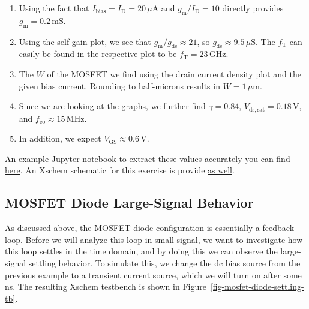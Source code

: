 \documentclass[
  a4paper,
  DIV=11,
  numbers=noendperiod]{scrartcl}
\providecommand{\tightlist}{%
  \setlength{\itemsep}{0pt}\setlength{\parskip}{0pt}}\usepackage{longtable,booktabs,array}
\begin{document}
\begin{tcolorbox}[enhanced jigsaw, titlerule=0mm, left=2mm, coltitle=black, toprule=.15mm, breakable, opacitybacktitle=0.6, colframe=quarto-callout-tip-color-frame, bottomtitle=1mm, toptitle=1mm, opacityback=0, colbacktitle=quarto-callout-tip-color!10!white, title=\textcolor{quarto-callout-tip-color}{\faLightbulb}\hspace{0.5em}{Solution: MOSFET Diode Sizing}, arc=.35mm, rightrule=.15mm, colback=white, bottomrule=.15mm, leftrule=.75mm]

\begin{enumerate}
\def\labelenumi{\arabic{enumi}.}
\tightlist
\item
  Using the fact that
  \(I_\mathrm{bias} = I_\mathrm{D} = 20\,\mu\text{A}\) and
  \(g_\mathrm{m}/I_\mathrm{D}= 10\) directly provides
  \(g_\mathrm{m}= 0.2\,\text{mS}\).
\item
  Using the self-gain plot, we see that
  \(g_\mathrm{m}/g_\mathrm{ds}\approx 21\), so
  \(g_\mathrm{ds}\approx 9.5\,\mu\text{S}\). The \(f_\mathrm{T}\) can
  easily be found in the respective plot to be
  \(f_\mathrm{T} = 23\,\text{GHz}\).
\item
  The \(W\) of the MOSFET we find using the drain current density plot
  and the given bias current. Rounding to half-microns results in
  \(W = 1\,\mu\text{m}\).
\item
  Since we are looking at the graphs, we further find \(\gamma = 0.84\),
  \(V_\mathrm{ds,sat} = 0.18\,\text{V}\), and
  \(f_\mathrm{co} \approx 15\,\text{MHz}\).
\item
  In addition, we expect \(V_\mathrm{GS}\approx 0.6\,\text{V}\).
\end{enumerate}

An example Jupyter notebook to extract these values accurately you can
find \href{./sizing/sizing_mosfet_diode.ipynb}{here}. An Xschem
schematic for this exercise is provide
\href{./xschem/mosfet_diode_sizing.sch}{as well}.

\end{tcolorbox}

\subsection{MOSFET Diode Large-Signal
Behavior}\label{mosfet-diode-large-signal-behavior}

As discussed above, the MOSFET diode configuration is essentially a
feedback loop. Before we will analyze this loop in small-signal, we want
to investigate how this loop settles in the time domain, and by doing
this we can observe the large-signal settling behavior. To simulate
this, we change the dc bias source from the previous example to a
transient current source, which we will turn on after some ns. The
resulting Xschem testbench is shown in
Figure~\ref{fig-mosfet-diode-settling-tb}.
\end{document}
